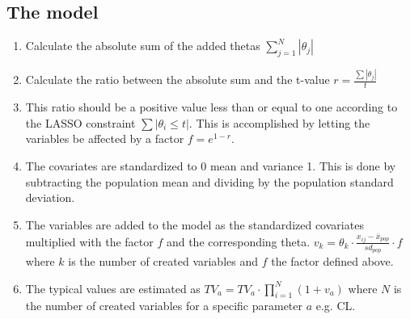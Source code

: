 \subsection{The model}
\begin{enumerate}
    \item Calculate the absolute sum of the added thetas $\sum_{j=1}^N |\theta_j|$ 
    \item Calculate the ratio between the absolute sum and the t-value $r = \frac{\sum{|\theta_j|}}{t}$
    \item This ratio should be a positive value less than or equal to one according to the LASSO constraint $\sum{|\theta_i \le t|}$. This is accomplished by letting the variables be affected by a factor $f=e^{1-r}$.
    \item The covariates are standardized to 0 mean and variance 1. This is done by subtracting the population mean and dividing by the population standard deviation.
    \item The variables are added to the model as the standardized covariates multiplied with the factor $f$ and the corresponding theta. $v_k = \theta_k \cdot \frac{x_{ij} - \bar{x}_{pop}}{sd_{pop}} \cdot f$ where $k$ is the number of created variables and $f$ the factor defined above.
    \item The typical values are estimated as $TV_a = TV_a \cdot \prod_{i=1}^N ( 1+v_a)$ where $N$ is the number of created variables for a specific parameter $a$ e.g. CL.
\end{enumerate}


{}



